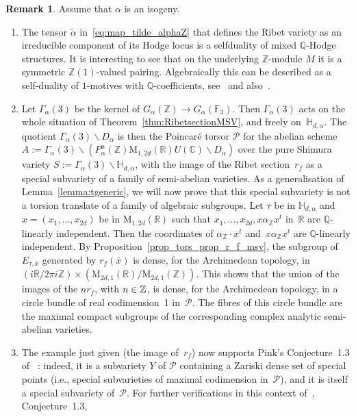 \documentclass[11pt]{article}
\providecommand{\C}{}
\newcommand{\ie}{i.e.,\xspace}
\let\mathcal\mathscr
\let\cal\mathcal
\theoremstyle{plain}
\theoremstyle{definition}
\newtheorem{Remark}[subsection]{Remark}
\numberwithin{equation}{subsection}
\let\ol\overline
\renewcommand{\C}{\mathbb C}
\newcommand{\R}{\mathbb R}
\newcommand{\Q}{\mathbb Q}
\newcommand{\Z}{\mathbb Z}
\newcommand{\F}{\mathbb F}
\renewcommand{\H}{\mathbb H}
\newcommand{\calP}{\mathcal{P}}
\newcommand{\rmM}{\mathrm{M}}
\begin{document}
\begin{Remark}\label{rem_r_f_msv}
Assume that $\alpha$ is an isogeny.
\begin{enumerate}
\item The tensor $\widetilde{\alpha}$ in~\eqref{eq:map_tilde_alphaZ}
that defines the Ribet variety as an irreducible component of its
Hodge locus is a selfduality of mixed $\Q$-Hodge structures. It is
interesting to see that on the underlying $\Z$-module $M$ it is a
symmetric $\Z(1)$-valued pairing. Algebraically this can be
described as a self-duality of $1$-motives with $\Q$-coefficients,
see~\cite{Ribet} and also~\cite{Bertrand13a}.
\item\label{rem_r_f_msv_item_2} Let $\Gamma_\alpha(3)$ be the kernel
of $G_\alpha(\Z)\to G_\alpha(\F_3)$. Then $\Gamma_\alpha(3)$ acts on
the whole situation of Theorem~\ref{thm:RibetsectionMSV}, and freely
on~$\H_{d,\alpha}$. The quotient $\Gamma_\alpha(3) \backslash
D_\alpha$ is then the Poincaré torsor $\calP$ for the abelian
scheme $A:=\Gamma_\alpha(3)\backslash
(P_\alpha^u(\Z)\rmM_{1,2d}(\R)U(\C)\backslash D_\alpha)$ over the
pure Shimura variety $S:=\Gamma_{\alpha}(3)\backslash
\H_{d,\alpha}$, with the image of the Ribet section~$r_f$ as a
special subvariety of a family of semi-abelian varieties. As a
generalisation of Lemma~\ref{lemma:tgeneric}, we will now prove that
this special subvariety is not a torsion translate of a family of
algebraic subgroups. Let $\tau$ be in $\H_{d,\alpha}$ and
$x=(x_1,\ldots,x_{2d})$ be in $\rmM_{1,2d}(\R)$ such that
$x_1,\ldots,x_{2d}, x\alpha_\Z x^t$ in~$\R$ are $\Q$-linearly
independent. Then the coordinates of $\alpha_\Z{\cdot}x^t$ and~$x\alpha_\Z x^t$ are $\Q$-linearly independent. By
Proposition~\ref{prop_tors_prop_r_f_msv}, the subgroup of
$E_{\tau,\ol{x}}$ generated by $r_f(\ol{x})$ is dense, for the
Archimedean topology, in $(i\R/2\pi
i\Z)\times(\rmM_{2d,1}(\R)/\rmM_{2d,1}(\Z))$. This shows that the
union of the images of the $nr_f$, with $n\in\nobreak\Z$, is dense, for the
Archimedean topology, in a circle bundle of real codimension~1
in~$\cal{P}$. The fibres of this circle bundle are the maximal
compact subgroups of the corresponding complex analytic semi-abelian
varieties.
\item The example just given (the image of~$r_f$) now supports Pink's
Conjecture~1.3 of ~\cite{Pink2}: indeed, it is a subvariety $Y$ of
$\calP$ containing a Zariski dense set of special points
(\ie special subvarieties of maximal codimension in~$\calP$), and
it is itself a special subvariety of~$\calP$. For further
verifications in this context of~\cite{Pink2}, Conjecture~1.3,

\end{enumerate}
\end{Remark}
\end{document}
